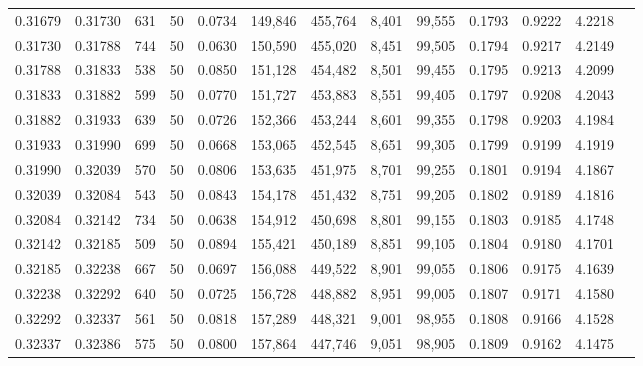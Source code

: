 \begin{tabular}{rrrrrrrrrrrrr}
0.31679 & 0.31730 &   631 &  50 &                                     0.0734 & 149,846 & 455,764 &   8,401 &  99,555 & 0.1793 & 0.9222 & 4.2218 \\
0.31730 & 0.31788 &   744 &  50 &                                     0.0630 & 150,590 & 455,020 &   8,451 &  99,505 & 0.1794 & 0.9217 & 4.2149 \\
0.31788 & 0.31833 &   538 &  50 &                                     0.0850 & 151,128 & 454,482 &   8,501 &  99,455 & 0.1795 & 0.9213 & 4.2099 \\
0.31833 & 0.31882 &   599 &  50 &                                     0.0770 & 151,727 & 453,883 &   8,551 &  99,405 & 0.1797 & 0.9208 & 4.2043 \\
0.31882 & 0.31933 &   639 &  50 &                                     0.0726 & 152,366 & 453,244 &   8,601 &  99,355 & 0.1798 & 0.9203 & 4.1984 \\
0.31933 & 0.31990 &   699 &  50 &                                     0.0668 & 153,065 & 452,545 &   8,651 &  99,305 & 0.1799 & 0.9199 & 4.1919 \\
0.31990 & 0.32039 &   570 &  50 &                                     0.0806 & 153,635 & 451,975 &   8,701 &  99,255 & 0.1801 & 0.9194 & 4.1867 \\
0.32039 & 0.32084 &   543 &  50 &                                     0.0843 & 154,178 & 451,432 &   8,751 &  99,205 & 0.1802 & 0.9189 & 4.1816 \\
0.32084 & 0.32142 &   734 &  50 &                                     0.0638 & 154,912 & 450,698 &   8,801 &  99,155 & 0.1803 & 0.9185 & 4.1748 \\
0.32142 & 0.32185 &   509 &  50 &                                     0.0894 & 155,421 & 450,189 &   8,851 &  99,105 & 0.1804 & 0.9180 & 4.1701 \\
0.32185 & 0.32238 &   667 &  50 &                                     0.0697 & 156,088 & 449,522 &   8,901 &  99,055 & 0.1806 & 0.9175 & 4.1639 \\
0.32238 & 0.32292 &   640 &  50 &                                     0.0725 & 156,728 & 448,882 &   8,951 &  99,005 & 0.1807 & 0.9171 & 4.1580 \\
0.32292 & 0.32337 &   561 &  50 &                                     0.0818 & 157,289 & 448,321 &   9,001 &  98,955 & 0.1808 & 0.9166 & 4.1528 \\
0.32337 & 0.32386 &   575 &  50 &                                     0.0800 & 157,864 & 447,746 &   9,051 &  98,905 & 0.1809 & 0.9162 & 4.1475 \\

\end{tabular}
